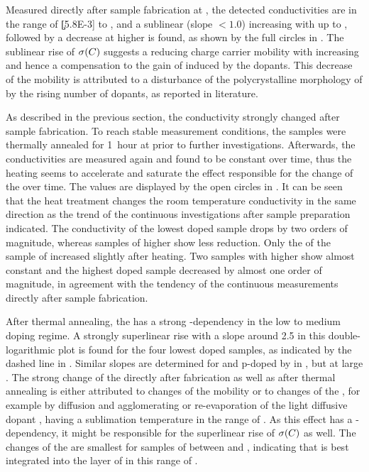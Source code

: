 Measured directly after sample fabrication at \T[25], the detected conductivities are in the range of \c[5.8E-3] to , and a sublinear (slope $< 1.0$) increasing with \CLong up to , followed by a decrease at higher \C is found, as shown by the full circles in .
The sublinear rise of $\c(\C)$ suggests a reducing charge carrier mobility with increasing \CLong and hence a compensation to the gain of \nhLong induced by the dopants. This decrease of the mobility is attributed to a disturbance of the polycrystalline morphology of \pen by the rising number of dopants, as reported in literature\cite{Kleemann2012a}.

As described in the previous section, the \insitu conductivity strongly changed after sample fabrication. To reach stable measurement conditions, the samples were thermally annealed for 1~hour at \T[70] prior to further investigations. Afterwards, the conductivities are measured again and found to be constant over time, thus the heating seems to accelerate and saturate the effect responsible for the change of the \cLong over time. The values are displayed by the open circles in . It can be seen that the heat treatment changes the room temperature conductivity in the same direction as the trend of the continuous investigations after sample preparation indicated.
The conductivity of the lowest doped sample drops by two orders of magnitude, whereas samples of higher \CLongs show less reduction. Only the \cLong of the sample of \C[0.043] increased slightly after heating. Two samples with higher \CLongs show almost constant \cLongs and the highest doped sample decreased by almost one order of magnitude, in agreement with the tendency of the continuous measurements directly after sample fabrication.

After thermal annealing, the \cLong has a strong \C-dependency in the low to medium doping regime. A strongly superlinear rise with a slope around 2.5 in this double-logarithmic plot is found for the four lowest doped samples, as indicated by the dashed line in . Similar slopes are determined for \meo and \lili p-doped by \CSF in , but at large \CLongs.
%
The strong change of the \cLong directly after fabrication as well as after thermal annealing is either attributed to changes of the mobility or to changes of the \nhLong, for example by diffusion and agglomerating or re-evaporation of the light diffusive dopant \FV, having a sublimation temperature in the range of \Tdep[100]. As this effect has a \C-dependency, it might be responsible for the superlinear rise of $\c(\C)$ as well.
The changes of the \cLong are smallest for samples of \CLongs between \C[0.043] and , indicating that \FV is best integrated into the layer of \pen in this range of \CLong.

